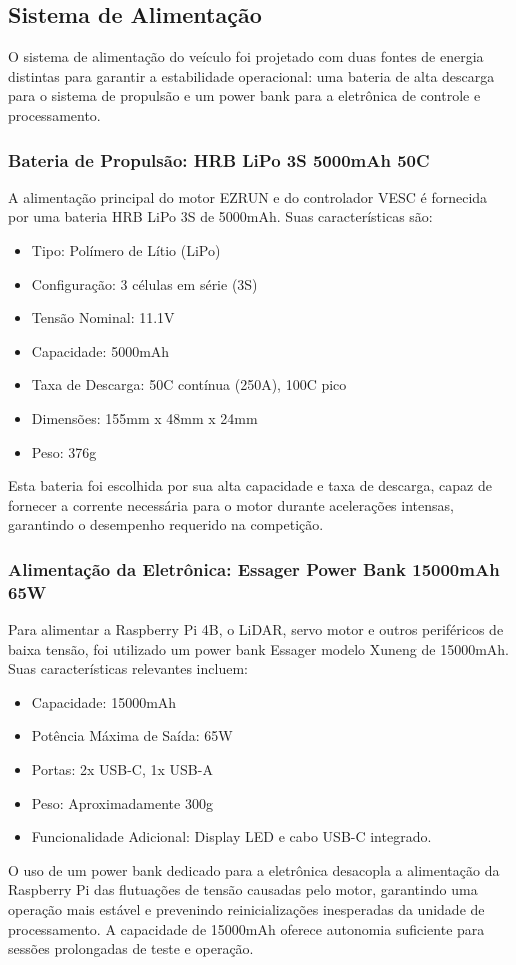 \subsection{Sistema de Alimentação}

O sistema de alimentação do veículo foi projetado com duas fontes de energia
distintas para garantir a estabilidade operacional: uma bateria de alta
descarga para o sistema de propulsão e um power bank para a eletrônica de
controle e processamento.

\subsubsection{Bateria de Propulsão: HRB LiPo 3S 5000mAh 50C}

A alimentação principal do motor EZRUN e do controlador VESC é fornecida por
uma bateria HRB LiPo 3S de 5000mAh. Suas características são:
\begin{itemize}
      \item Tipo: Polímero de Lítio (LiPo)
      \item Configuração: 3 células em série (3S)
      \item Tensão Nominal: 11.1V
      \item Capacidade: 5000mAh
      \item Taxa de Descarga: 50C contínua (250A), 100C pico
      \item Dimensões: 155mm x 48mm x 24mm
      \item Peso: 376g
\end{itemize}
Esta bateria foi escolhida por sua alta capacidade e taxa de descarga, capaz de
fornecer a corrente necessária para o motor durante acelerações intensas,
garantindo o desempenho requerido na competição.

\subsubsection{Alimentação da Eletrônica: Essager Power Bank 15000mAh 65W}

Para alimentar a Raspberry Pi 4B, o LiDAR, servo motor e outros periféricos de
baixa tensão, foi utilizado um power bank Essager modelo Xuneng de 15000mAh.
Suas características relevantes incluem:
\begin{itemize}
      \item Capacidade: 15000mAh
      \item Potência Máxima de Saída: 65W
      \item Portas: 2x USB-C, 1x USB-A
      \item Peso: Aproximadamente 300g
      \item Funcionalidade Adicional: Display LED e cabo USB-C integrado.
\end{itemize}
O uso de um power bank dedicado para a eletrônica desacopla a alimentação da
Raspberry Pi das flutuações de tensão causadas pelo motor, garantindo uma
operação mais estável e prevenindo reinicializações inesperadas da unidade de
processamento. A capacidade de 15000mAh oferece autonomia suficiente para
sessões prolongadas de teste e operação.

